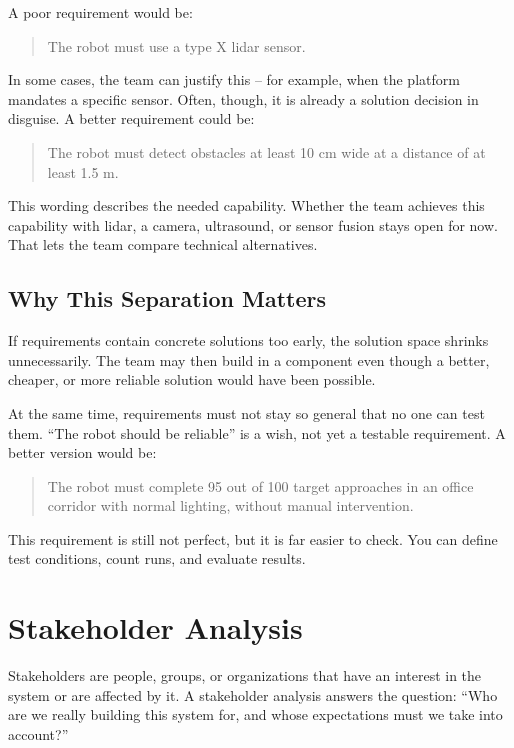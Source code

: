 A poor requirement would be:

\begin{quote}
The robot must use a type X lidar sensor.
\end{quote}

In some cases, the team can justify this -- for example, when the platform mandates a specific sensor. Often, though, it is already a solution decision in disguise. A better requirement could be:

\begin{quote}
The robot must detect obstacles at least 10 cm wide at a distance of at least 1.5 m.
\end{quote}

This wording describes the needed capability. Whether the team achieves this capability with lidar, a camera, ultrasound, or sensor fusion stays open for now. That lets the team compare technical alternatives.

\subsection{Why This Separation Matters}
If requirements contain concrete solutions too early, the solution space shrinks unnecessarily. The team may then build in a component even though a better, cheaper, or more reliable solution would have been possible.

At the same time, requirements must not stay so general that no one can test them. \enquote{The robot should be reliable} is a wish, not yet a testable requirement. A better version would be:

\begin{quote}
The robot must complete 95 out of 100 target approaches in an office corridor with normal lighting, without manual intervention.
\end{quote}

This requirement is still not perfect, but it is far easier to check. You can define test conditions, count runs, and evaluate results.

\section{Stakeholder Analysis}
Stakeholders are people, groups, or organizations that have an interest in the system or are affected by it. A stakeholder analysis answers the question: \enquote{Who are we really building this system for, and whose expectations must we take into account?}

